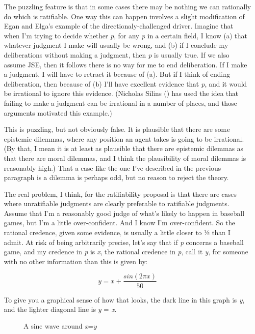\documentclass[
  10pt,
  letterpaper,
  DIV=11,
  numbers=noendperiod,
  twoside]{scrartcl}
\makeatletter
\newcommand*\pandocbounded[1]{%
  \sbox\pandoc@box{#1}%
  \Gscale@div\@tempa{\textheight}{\dimexpr\ht\pandoc@box+\dp\pandoc@box\relax}%
  \Gscale@div\@tempb{\linewidth}{\wd\pandoc@box}%
  \ifdim\@tempb\p@<\@tempa\p@\let\@tempa\@tempb\fi%
  \ifdim\@tempa\p@<\p@\scalebox{\@tempa}{\usebox\pandoc@box}%
  \else\usebox{\pandoc@box}%
  \fi%
}
\makeatother
\begin{document}
The puzzling feature is that in some cases there may be nothing we can
rationally do which is ratifiable. One way this can happen involves a
slight modification of Egan and Elga's example of the
directionaly-challenged driver. Imagine that when I'm trying to decide
whether \emph{p}, for any \emph{p} in a certain field, I know (a) that
whatever judgment I make will usually be wrong, and (b) if I conclude my
deliberations without making a judgment, then \emph{p} is usually true.
If we also assume JSE, then it follows there is no way for me to end
deliberation. If I make a judgment, I will have to retract it because of
(a). But if I think of ending deliberation, then because of (b) I'll
have excellent evidence that \emph{p}, and it would be irrational to
ignore this evidence. (Nicholas Silins ()
has used the idea that failing to make a judgment can be irrational in a
number of places, and those arguments motivated this example.)

This is puzzling, but not obviously false. It is plausible that there
are some epistemic dilemmas, where any position an agent takes is going
to be irrational. (By that, I mean it is at least as plausible that
there are epistemic dilemmas as that there are moral dilemmas, and I
think the plausibility of moral dilemmas is reasonably high.) That a
case like the one I've described in the previous paragraph is a dilemma
is perhaps odd, but no reason to reject the theory.

The real problem, I think, for the ratifiability proposal is that there
are cases where unratifiable judgments are clearly preferable to
ratifiable judgments. Assume that I'm a reasonably good judge of what's
likely to happen in baseball games, but I'm a little over-confident. And
I know I'm over-confident. So the rational credence, given some
evidence, is usually a little closer to ½ than I admit. At risk of being
arbitrarily precise, let's say that if \emph{p} concerns a baseball
game, and my credence in \emph{p} is \emph{x}, the rational credence in
\emph{p}, call it \emph{y}, for someone with no other information than
this is given by:

\[
y = x + \frac{sin(2\pi x)}{50}
\]

To give you a graphical sense of how that looks, the dark line in this
graph is \emph{y}, and the lighter diagonal line is \emph{y} = \emph{x}.

\begin{figure}[H]

{\centering \pandocbounded{\texttt{[image: sinewave.JPG]}}

}

\caption{A sine wave around \emph{x}=\emph{y}}

\end{figure}%
\end{document}
